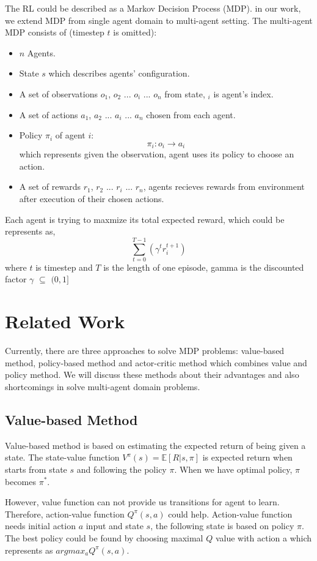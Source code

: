 \documentclass[11pt,twocolumn]{jarticle} %
\begin{document}
The RL could be described as a Markov Decision Process (MDP). in our work, we extend MDP from single agent domain to multi-agent setting. The multi-agent MDP consists of (timestep $t$ is omitted):
\begin{itemize}
  \item $n$ Agents.
  \item State $s$ which describes agents' configuration.
  \item A set of observations $o_1$, $o_2$ ... $o_i$ ... $o_n$ from state, $_i$ is agent's index.
  \item A set of actions $a_1$, $a_2$ ... $a_i$ ... $a_n$ chosen from each agent.
  \item Policy $\pi_i$ of agent $i$: \[\pi_i: o_i \rightarrow a_i\] which represents given the observation, agent uses its policy to choose an action.
  \item A set of rewards $r_1$, $r_2$ ... $r_i$ ... $r_n$, agents recieves rewards from environment after execution of their chosen actions.
\end{itemize}
Each agent is trying to maxmize its total expected reward, which could be represents as,
\[ \sum_{t=0}^{T-1}(\gamma^t r_i^{t+1}) \]
where $t$ is timestep and $T$ is the length of one episode, gamma is the discounted factor $\gamma$ $\subseteq$ $(0, 1]$

\section{Related Work}

Currently, there are three approaches to solve MDP problems: value-based method, policy-based method and actor-critic method which combines value and policy method. We will discuss these methods about their advantages and also shortcomings in solve multi-agent domain problems.

\subsection{Value-based Method}

Value-based method is based on estimating the expected return of being given a state. The state-value function $V^\pi(s) = \mathbb{E}[R|s, \pi]$ is expected return when starts from state $s$ and following the policy $\pi$. When we have optimal policy, $\pi$ becomes $\pi^*$. \par
However, value function can not provide us transitions for agent to learn. Therefore, action-value function $Q^\pi(s, a)$ could help. Action-value function needs initial action $a$ input and state $s$, the following state is based on policy $\pi$. The best policy could be found by choosing maximal $Q$ value with action a which represents as $argmax_a Q^\pi(s, a)$. 
\end{document}
